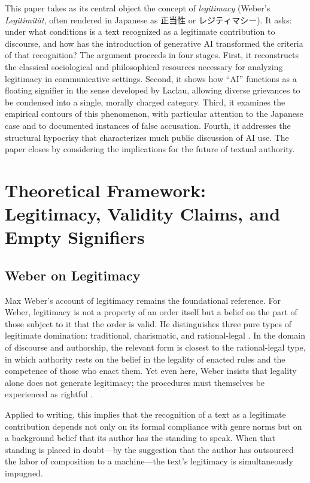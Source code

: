 \documentclass[12pt,a4paper]{article}
\begin{document}
This paper takes as its central object the concept of \emph{legitimacy} (Weber's \emph{Legitimität}, often rendered in Japanese as 正当性 or レジティマシー). It asks: under what conditions is a text recognized as a legitimate contribution to discourse, and how has the introduction of generative AI transformed the criteria of that recognition? The argument proceeds in four stages. First, it reconstructs the classical sociological and philosophical resources necessary for analyzing legitimacy in communicative settings. Second, it shows how ``AI'' functions as a floating signifier in the sense developed by Laclau, allowing diverse grievances to be condensed into a single, morally charged category. Third, it examines the empirical contours of this phenomenon, with particular attention to the Japanese case and to documented instances of false accusation. Fourth, it addresses the structural hypocrisy that characterizes much public discussion of AI use. The paper closes by considering the implications for the future of textual authority.

\section{Theoretical Framework: Legitimacy, Validity Claims, and Empty Signifiers}

\subsection{Weber on Legitimacy}

Max Weber's account of legitimacy remains the foundational reference. For Weber, legitimacy is not a property of an order itself but a belief on the part of those subject to it that the order is valid. He distinguishes three pure types of legitimate domination: traditional, charismatic, and rational-legal \citep{weber1978}. In the domain of discourse and authorship, the relevant form is closest to the rational-legal type, in which authority rests on the belief in the legality of enacted rules and the competence of those who enact them. Yet even here, Weber insists that legality alone does not generate legitimacy; the procedures must themselves be experienced as rightful \citep{weber1978,habermas1984}.

Applied to writing, this implies that the recognition of a text as a legitimate contribution depends not only on its formal compliance with genre norms but on a background belief that its author has the standing to speak. When that standing is placed in doubt—by the suggestion that the author has outsourced the labor of composition to a machine—the text's legitimacy is simultaneously impugned.
\end{document}
